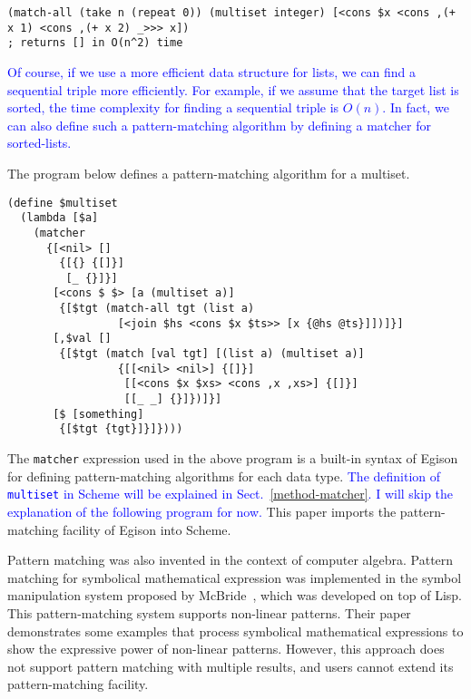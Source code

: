 \documentclass[acmlarge]{acmart}
\newcommand{\new}[1]{\textcolor{blue}{#1}}
\begin{document}
\begin{lstlisting}[language=egison]
(match-all (take n (repeat 0)) (multiset integer) [<cons $x <cons ,(+ x 1) <cons ,(+ x 2) _>>> x])
; returns [] in O(n^2) time
\end{lstlisting}

\noindent
\new{
Of course, if we use a more efficient data structure for lists, we can find a sequential triple more efficiently.
For example, if we assume that the target list is sorted, the time complexity for finding a sequential triple is $O(n)$.
In fact, we can also define such a pattern-matching algorithm by defining a matcher for sorted-lists.
}%

The program below defines a pattern-matching algorithm for a multiset.

\begin{lstlisting}[language=egison]
(define $multiset
  (lambda [$a]
    (matcher
      {[<nil> []
        {[{} {[]}]
         [_ {}]}]
       [<cons $ $> [a (multiset a)]
        {[$tgt (match-all tgt (list a)
                 [<join $hs <cons $x $ts>> [x {@hs @ts}]])]}]
       [,$val []
        {[$tgt (match [val tgt] [(list a) (multiset a)]
                 {[[<nil> <nil>] {[]}]
                  [[<cons $x $xs> <cons ,x ,xs>] {[]}]
                  [[_ _] {}]})]}]
       [$ [something]
        {[$tgt {tgt}]}]})))
\end{lstlisting}

\noindent
The \lstinline{matcher} expression used in the above program is a built-in syntax of Egison for defining pattern-matching algorithms for each data type.
\new{
The definition of \lstinline{multiset} in Scheme will be explained in Sect.~\ref{method-matcher}.
I will skip the explanation of the following program for now.
}%
This paper imports the pattern-matching facility of Egison into Scheme.

\medskip

Pattern matching was also invented in the context of computer algebra.
Pattern matching for symbolical mathematical expression was implemented in the symbol manipulation system proposed by McBride~\cite{mcbride1969symbol}, which was developed on top of Lisp.
This pattern-matching system supports non-linear patterns.
Their paper demonstrates some examples that process symbolical mathematical expressions to show the expressive power of non-linear patterns.
However, this approach does not support pattern matching with multiple results, and users cannot extend its pattern-matching facility.
\end{document}
